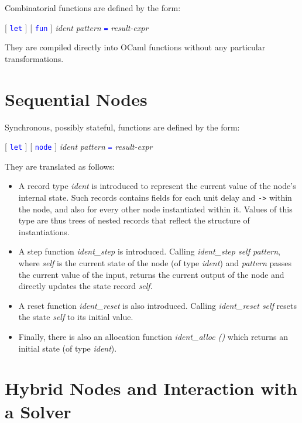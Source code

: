 \documentclass[11pt,titlepage,twoside]{report}
\makeatletter
\newcommand{\zls}[1]{{\@span{class="zelusinline"}#1}}
\newcommand{\zls}[1]{\texttt{#1}}
\renewcommand{\zls}[1]{\texttt{#1}}
\newenvironment{flatitemize}
  {\setenvclass{itemize}{flatitemize}%
   \begin{itemize}}
  {\end{itemize}}
\newenvironment{flatitemize}
  {\begin{itemize}[leftmargin=*]}
  {\end{itemize}}
\newcommand{\ocaml}{{\sf OCaml}}
\newcommand{\term}[1]{\textcolor{Blue}{\tt #1}}
\newcommand{\nterm}[1]{\textcolor{BrickRed}{\it #1}}
\newcommand{\term}[1]{{\tt #1}}
\newcommand{\nterm}[1]{{\em #1}}
\makeatother
\begin{document}
Combinatorial functions are defined by the form:
\begin{center}
  [ \term{let} ] [ \term{fun} ] \nterm{ident} \nterm{pattern} \term{=}
  \nterm{result-expr}
\end{center}

\medskip\noindent
They are compiled directly into \ocaml{} functions without any particular 
transformations.

\section{Sequential Nodes\label{seqnodes}} %

Synchronous, possibly stateful, functions are defined by the form:
\begin{center}
  [ \term{let} ] [ \term{node} ] \nterm{ident} \nterm{pattern} \term{=}
  \nterm{result-expr}
\end{center}

\medskip\noindent
They are translated as follows:
\begin{flatitemize}
\item
A record type \nterm{ident} is introduced to represent the current value of 
the node's internal state.
Such records contains fields for each unit delay and \zls{->} within the 
node, and also for every other node instantiated within it.
Values of this type are thus trees of nested records that reflect the 
structure of instantiations.

\item
A step function \nterm{ident\_step} is introduced.
Calling \nterm{ident\_step self pattern}, where \nterm{self} is the current 
state of the node (of type \nterm{ident}) and \nterm{pattern} passes the 
current value of the input, returns the current output of the node and 
directly updates the state record \nterm{self}.

\item
A reset function \nterm{ident\_reset} is also introduced.
Calling \nterm{ident\_reset self} resets the state \nterm{self} to its 
initial value.

\item
Finally, there is also an allocation function \nterm{ident\_alloc ()} which 
returns an initial state (of type \nterm{ident}).
\end{flatitemize}

\section{Hybrid Nodes and Interaction with a Solver\label{hybridnodes}} %
\end{document}
